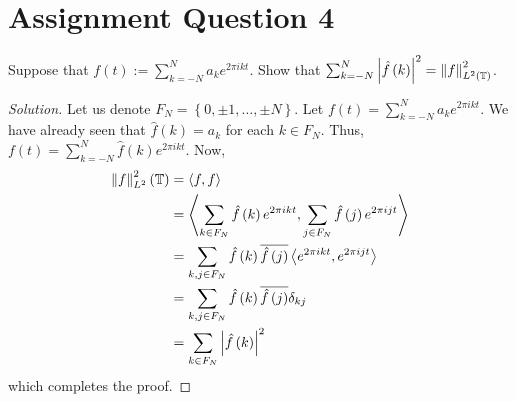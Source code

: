 \section{Assignment Question 4}
\horz
Suppose that $f(t):=\sum_{k=-N}^{N} a_{k} e^{2\pi i k t}$. Show that $\sum_{k=-N}^{N} \left\lvert \hat{f}\left( k \right) \right\rvert^{2} = \left\lVert f \right\rVert_{L^{2} \left( \mathbb T \right)}^{2}$.
\horz
\begin{proof}[Solution]
Let us denote $F_{N} = \left\{ 0, \pm 1, \ldots , \pm N \right\}$.
Let $f\left( t \right) = \sum_{k=-N}^{N} a_{k} e^{2\pi i k t}$. We have already seen that $\hat{f} \left( k \right) = a_{k}$ for each $k \in F_{N}$. Thus, $f\left( t \right) = \sum_{k=-N}^{N} \hat{f}\left( k \right)e^{2\pi i kt}$. Now,
\begin{align*}
{\left\lVert f \right\rVert_{L^{2}}^{2} \left( \mathbb T\right)} &= \left\langle f,f \right\rangle \\
&= \left\langle \sum_{k \in F_{N}}\hat{f} \left( k \right) e^{2\pi i kt}, \sum_{j \in F_{N}}\hat{f} \left( j \right) e^{2\pi i jt} \right\rangle \\
&= \sum_{k,j \in F_{N}} \hat{f}\left( k \right) \overline{\hat{f} \left( j \right)} \left\langle e^{2\pi i k t}, e^{2\pi i j t} \right\rangle \\
&= \sum_{k,j \in F_{N}} \hat{f} \left( k \right) \overline{\hat{f} \left( j \right)} \delta_{kj} \\
&= \sum_{k \in F_{N}} \left\lvert \hat{f} \left( k \right) \right\rvert^{2}
\end{align*}
which completes the proof.
\end{proof}
